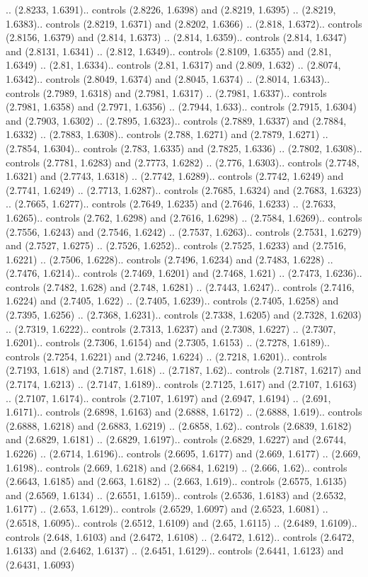 .. (2.8233, 1.6391).. controls (2.8226, 1.6398) and (2.8219, 1.6395) .. (2.8219, 1.6383).. controls (2.8219, 1.6371) and (2.8202, 1.6366) .. (2.818, 1.6372).. controls (2.8156, 1.6379) and (2.814, 1.6373) .. (2.814, 1.6359).. controls (2.814, 1.6347) and (2.8131, 1.6341) .. (2.812, 1.6349).. controls (2.8109, 1.6355) and (2.81, 1.6349) .. (2.81, 1.6334).. controls (2.81, 1.6317) and (2.809, 1.632) .. (2.8074, 1.6342).. controls (2.8049, 1.6374) and (2.8045, 1.6374) .. (2.8014, 1.6343).. controls (2.7989, 1.6318) and (2.7981, 1.6317) .. (2.7981, 1.6337).. controls (2.7981, 1.6358) and (2.7971, 1.6356) .. (2.7944, 1.633).. controls (2.7915, 1.6304) and (2.7903, 1.6302) .. (2.7895, 1.6323).. controls (2.7889, 1.6337) and (2.7884, 1.6332) .. (2.7883, 1.6308).. controls (2.788, 1.6271) and (2.7879, 1.6271) .. (2.7854, 1.6304).. controls (2.783, 1.6335) and (2.7825, 1.6336) .. (2.7802, 1.6308).. controls (2.7781, 1.6283) and (2.7773, 1.6282) .. (2.776, 1.6303).. controls (2.7748, 1.6321) and (2.7743, 1.6318) .. (2.7742, 1.6289).. controls (2.7742, 1.6249) and (2.7741, 1.6249) .. (2.7713, 1.6287).. controls (2.7685, 1.6324) and (2.7683, 1.6323) .. (2.7665, 1.6277).. controls (2.7649, 1.6235) and (2.7646, 1.6233) .. (2.7633, 1.6265).. controls (2.762, 1.6298) and (2.7616, 1.6298) .. (2.7584, 1.6269).. controls (2.7556, 1.6243) and (2.7546, 1.6242) .. (2.7537, 1.6263).. controls (2.7531, 1.6279) and (2.7527, 1.6275) .. (2.7526, 1.6252).. controls (2.7525, 1.6233) and (2.7516, 1.6221) .. (2.7506, 1.6228).. controls (2.7496, 1.6234) and (2.7483, 1.6228) .. (2.7476, 1.6214).. controls (2.7469, 1.6201) and (2.7468, 1.621) .. (2.7473, 1.6236).. controls (2.7482, 1.628) and (2.748, 1.6281) .. (2.7443, 1.6247).. controls (2.7416, 1.6224) and (2.7405, 1.622) .. (2.7405, 1.6239).. controls (2.7405, 1.6258) and (2.7395, 1.6256) .. (2.7368, 1.6231).. controls (2.7338, 1.6205) and (2.7328, 1.6203) .. (2.7319, 1.6222).. controls (2.7313, 1.6237) and (2.7308, 1.6227) .. (2.7307, 1.6201).. controls (2.7306, 1.6154) and (2.7305, 1.6153) .. (2.7278, 1.6189).. controls (2.7254, 1.6221) and (2.7246, 1.6224) .. (2.7218, 1.6201).. controls (2.7193, 1.618) and (2.7187, 1.618) .. (2.7187, 1.62).. controls (2.7187, 1.6217) and (2.7174, 1.6213) .. (2.7147, 1.6189).. controls (2.7125, 1.617) and (2.7107, 1.6163) .. (2.7107, 1.6174).. controls (2.7107, 1.6197) and (2.6947, 1.6194) .. (2.691, 1.6171).. controls (2.6898, 1.6163) and (2.6888, 1.6172) .. (2.6888, 1.619).. controls (2.6888, 1.6218) and (2.6883, 1.6219) .. (2.6858, 1.62).. controls (2.6839, 1.6182) and (2.6829, 1.6181) .. (2.6829, 1.6197).. controls (2.6829, 1.6227) and (2.6744, 1.6226) .. (2.6714, 1.6196).. controls (2.6695, 1.6177) and (2.669, 1.6177) .. (2.669, 1.6198).. controls (2.669, 1.6218) and (2.6684, 1.6219) .. (2.666, 1.62).. controls (2.6643, 1.6185) and (2.663, 1.6182) .. (2.663, 1.619).. controls (2.6575, 1.6135) and (2.6569, 1.6134) .. (2.6551, 1.6159).. controls (2.6536, 1.6183) and (2.6532, 1.6177) .. (2.653, 1.6129).. controls (2.6529, 1.6097) and (2.6523, 1.6081) .. (2.6518, 1.6095).. controls (2.6512, 1.6109) and (2.65, 1.6115) .. (2.6489, 1.6109).. controls (2.648, 1.6103) and (2.6472, 1.6108) .. (2.6472, 1.612).. controls (2.6472, 1.6133) and (2.6462, 1.6137) .. (2.6451, 1.6129).. controls (2.6441, 1.6123) and (2.6431, 1.6093) 